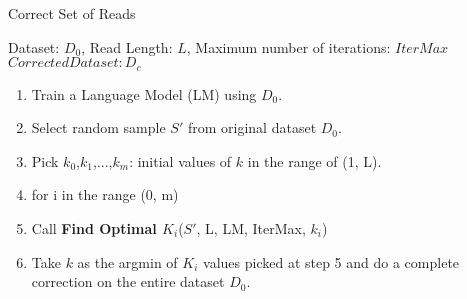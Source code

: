 \begin{minipage}[t]{.45\textwidth}
\begin{algorithm}[H]
\caption{Correct Set of Reads}
\begin{algorithmic} 
\REQUIRE Dataset: $D_{0}$, Read Length: $L$, Maximum number of iterations: $IterMax$
\ENSURE $Corrected Dataset: D_c$
\begin{enumerate}
\itemsep0em
\item Train a Language Model (LM) using $D_{0}$.
\item Select random sample $S'$ from original dataset $D_{0}$.
\item Pick $k_0$,$k_1$,...,$k_m$: initial values of $k$ in the range of (1, L).
\item for i in the range (0, m) 
\item \quad Call \textbf{Find Optimal $K_i$}($S'$, L, LM, IterMax, $k_i$)
\item Take $k$ as the argmin of $K_i$ values picked at step 5 and do a complete correction on the entire dataset $D_0$.
\end{enumerate}
\end{algorithmic}
\end{algorithm}
\end{minipage}
\hfill
